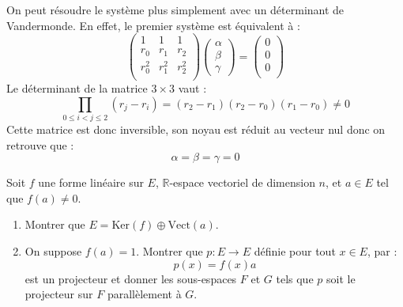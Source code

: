 \documentclass[a4paper,10pt]{report}
\begin{document}
\begin{enumerate}
\medskip

\noindent On peut résoudre le système plus simplement avec un déterminant de Vandermonde. En effet, le premier système est équivalent à :
$$ \begin{pmatrix}
1 & 1 & 1 \\
r_0 & r_1 & r_2 \\
r_0^2 & r_1^2 & r_2^2 \\
\end{pmatrix} \begin{pmatrix}
\alpha \\
\beta \\
\gamma
\end{pmatrix} = \begin{pmatrix}
0 \\
0 \\
0 \\
\end{pmatrix}$$ 
Le déterminant de la matrice $3 \times 3$ vaut :
$$ \prod_{0 \leq i <j \leq 2} (r_j-r_i) = (r_2-r_1)(r_2-r_0)(r_1-r_0) \neq 0$$
Cette matrice est donc inversible, son noyau est réduit au vecteur nul donc on retrouve que :
$$ \alpha = \beta = \gamma = 0$$
\end{enumerate}

\begin{Exercice}{} Soit $f$ une forme linéaire sur $E$, $\mathbb{R}$-espace vectoriel de dimension $n$, et $a\in E$ tel que $f(a)\neq 0$.
\begin{enumerate}
\item Montrer que $E=\textrm{Ker}(f)\oplus\textrm{Vect}(a)$.
\item On suppose $f(a)=1$. Montrer que $p : E \rightarrow E$ définie pour tout $x \in E$, par :
$$ p(x) = f(x) a $$
est un projecteur et donner les sous-espaces $F$ et $G$ tels que $p$ soit le projecteur sur $F$ parallèlement à $G$.
\end{enumerate}
\end{Exercice}

\corr 
\end{document}
